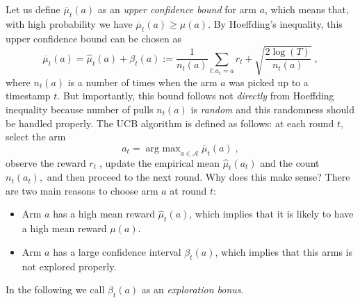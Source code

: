 \documentclass{article}
\numberwithin{equation}{section}
\newcommand{\cA}{\mathcal{A}}
\newcommand{\eqsp}{\;}
\DeclareMathOperator*{\argmax}{arg\ max}
\begin{document}
Let us define $\overline{\mu}_t(a)$ as an \emph{upper confidence bound} for arm $a$, which means that, with high probability we have $\overline{\mu}_t(a) \geq \mu(a)$. By Hoeffding's inequality, this upper confidence bound can be chosen as
\[  
    \overline{\mu}_t(a) = \widehat{\mu}_t(a) + \beta_t(a) := \frac{1}{n_t(a)} \sum_{t: a_t = a} r_t + \sqrt{\frac{2\log(T)}{n_t(a)}}\eqsp,
\]
where $n_t(a)$ is a number of times when the arm $a$ was picked up to a timestamp $t$. But importantly, this bound follows not \textit{directly} from Hoeffding inequality because number of pulls $n_t(a)$ is \textit{random} and this randomness should be handled properly. The UCB algorithm is defined as follows: at each round \(t\), select the arm
\begin{equation}
    a_t = \argmax_{a \in \cA} \overline{\mu}_t(a)\eqsp,
\end{equation}
observe the reward \(r_t\eqsp\), update the empirical mean \(\widehat{\mu}_t(a_t)\) and the count \(n_t(a_t),\) and then proceed to the next round. Why does this make sense? There are two main reasons to choose arm $a$ at round $t$:
\begin{itemize}
    \item Arm $a$ has a high mean reward $\widehat{\mu}_t(a)$, which implies that it is likely to have a high mean reward $\mu(a)$.
    \item Arm $a$ has a large confidence interval $\beta_t(a)$, which implies that this arms is not explored properly.
\end{itemize}

In the following we call $\beta_t(a)$ as an \textit{exploration bonus}.
\end{document}
